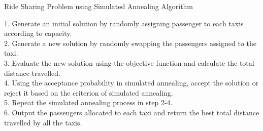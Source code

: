 \documentclass{article}
\begin{document}
\begin{algorithm}
\caption{Ride Sharing Problem using Simulated Annealing Algorithm}\label{alg:two}

1. Generate an initial solution by randomly assigning passenger to each taxis according to capacity. \\

2. Generate a new solution by randomly swapping the passengers assigned to the taxi. \\

3. Evaluate the new solution using the objective function and calculate the total distance travelled. \\

4. Using the acceptance probability in simulated annealing, accept the solution or reject it based on the criterion of simulated annealing. \\

5. Repeat the simulated annealing process in step 2-4. \\

6. Output the passengers allocated to each taxi and return the best total distance travelled by all the taxis.

\end{algorithm}
\end{document}
